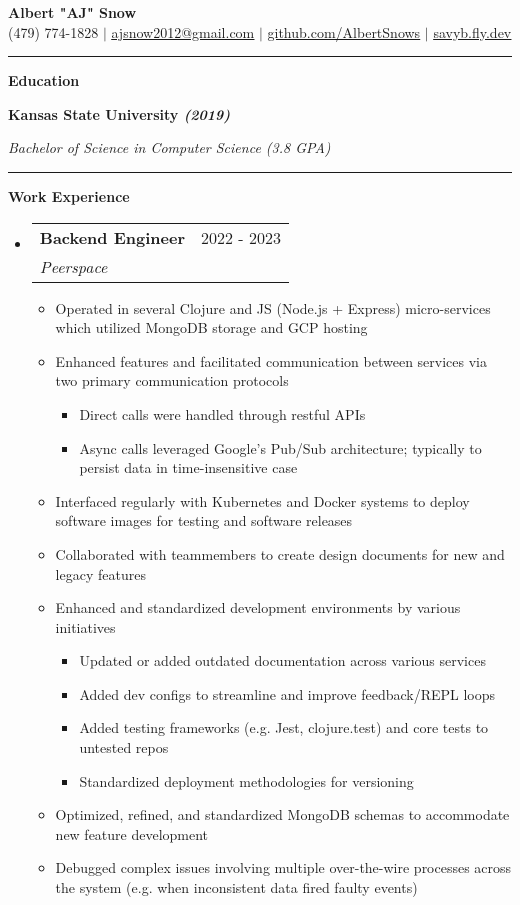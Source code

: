 \documentclass[letterpaper,11pt]{article}
\makeatletter
\newcommand{\resumeItem}[1]{
  \item\small{
    {#1 \vspace{-2pt}}
  }
}
\newcommand{\resumeSubheading}[4]{
  \vspace{-2pt}\item
    \begin{tabular*}{0.97\textwidth}[t]{l@{\extracolsep{\fill}}r}
      \textbf{#1} & #2 \\
      \textit{\small#3} & \textit{\small #4} \\
    \end{tabular*}\vspace{0pt}
}
\newcommand{\resumeSubHeadingListStart}{\begin{itemize}[leftmargin=0.15cm, label={}]}
\newcommand{\resumeSubHeadingListEnd}{\end{itemize}}
\newcommand{\resumeItemListStart}{\begin{itemize}}
\newcommand{\resumeItemListEnd}{\end{itemize}\vspace{-5pt}}
\makeatother
\begin{document}
\textbf{\normalshape \Large \textcolor{magic_blue}{Albert "AJ" Snow}} \\ \vspace{3pt}
\small (479) 774-1828 $|$ \href{mailto:ajsnow2012@gmail.com}
{\underline{ajsnow2012@gmail.com}} $|$
\href{https://github.com/AlbertSnows}{\underline{github.com/AlbertSnows}}
$|$ \href{https://savyb.fly.dev/}{\underline{savyb.fly.dev}}
\noindent\rule{19.5cm}{0.4pt}

\textbf{\large \textcolor{magic_blue}{Education}}

\begin{minipage}[t]{0.45\textwidth}
	\raggedright
	\textbf{ Kansas State University \textit{(2019)}} \\
\end{minipage}
\hfill
\begin{minipage}[t]{0.45\textwidth}
	\raggedleft
	\textit{Bachelor of Science in Computer Science (3.8 GPA)} \\
\end{minipage}
\noindent\rule{19.5cm}{0.4pt}

\textbf{\large \textcolor{magic_blue}{Work Experience}}
\resumeSubHeadingListStart
\resumeSubheading
{Backend Engineer}{2022 - 2023}
{Peerspace}{}
\resumeItemListStart
\resumeItem{Operated in several Clojure and JS (Node.js + Express) micro-services which utilized MongoDB storage and GCP hosting}
\resumeItem{Enhanced features and facilitated communication between services via two primary communication protocols}
\begin{itemize}
	\item Direct calls were handled through restful APIs
	\item Async calls leveraged Google's Pub/Sub architecture; typically to persist data in time-insensitive case
\end{itemize}
\resumeItem{Interfaced regularly with Kubernetes and Docker systems to deploy software images for testing and software releases}
\resumeItem{Collaborated with teammembers to create design documents for new and legacy features}
\resumeItem{Enhanced and standardized development environments by various initiatives}
\begin{itemize}
	\item Updated or added outdated documentation across various services
	\item Added dev configs to streamline and improve feedback/REPL loops
	\item Added testing frameworks (e.g. Jest, clojure.test) and core tests to untested repos
	\item Standardized deployment methodologies for versioning
\end{itemize}
\resumeItem{Optimized, refined, and standardized MongoDB schemas to accommodate new feature development}
\resumeItem{Debugged complex issues involving multiple over-the-wire processes across the system (e.g. when inconsistent data fired faulty events) }
\resumeItemListEnd
\resumeSubHeadingListEnd
\end{document}

